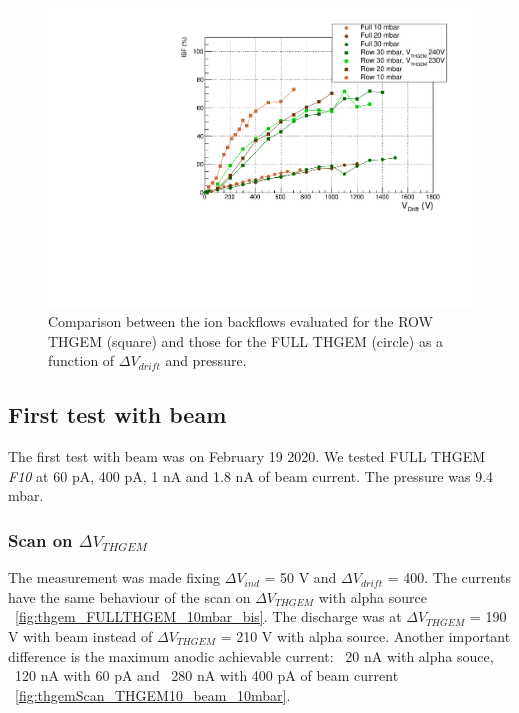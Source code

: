 \documentclass[a4paper, 11 pt]{article}
\newcommand{\Vind}{$\Delta V_{ind}$}
\newcommand{\Vthgem}{$\Delta V_{THGEM}$}
\newcommand{\Vdrift}{$ \Delta V_{drift}$}
\begin{document}
\begin{figure}[htbp]
	\centering
	\includegraphics[width=\textwidth]{Immagini/IBFvsDrift_FULLandROW.pdf}
	\caption{Comparison between the ion backflows evaluated for the ROW THGEM (square) and those for the FULL THGEM (circle) as a function of \Vdrift{} and pressure.}
	\label{fig:ion_backflow_FULLandROW}
\end{figure}







\clearpage


\subsection{First test with beam}

The first test with beam was on February 19 2020. We tested FULL THGEM \textit{F10} at 60 pA, 400 pA, 1 nA and 1.8 nA of beam current. The pressure was 9.4 mbar.

\subsubsection{Scan on \Vthgem}

The measurement was made fixing \Vind{} = 50 V and \Vdrift{} = 400. The currents have the same behaviour of the scan on \Vthgem{} with alpha source ~\ref{fig:thgem_FULLTHGEM_10mbar_bis}. The discharge was at \Vthgem{} = 190 V with beam instead of \Vthgem{} = 210 V with alpha source. Another important difference is the maximum anodic achievable current: ~20 nA with alpha souce, ~120 nA with 60 pA and ~280 nA with 400 pA of beam current ~\ref{fig:thgemScan_THGEM10_beam_10mbar}.
\end{document}
